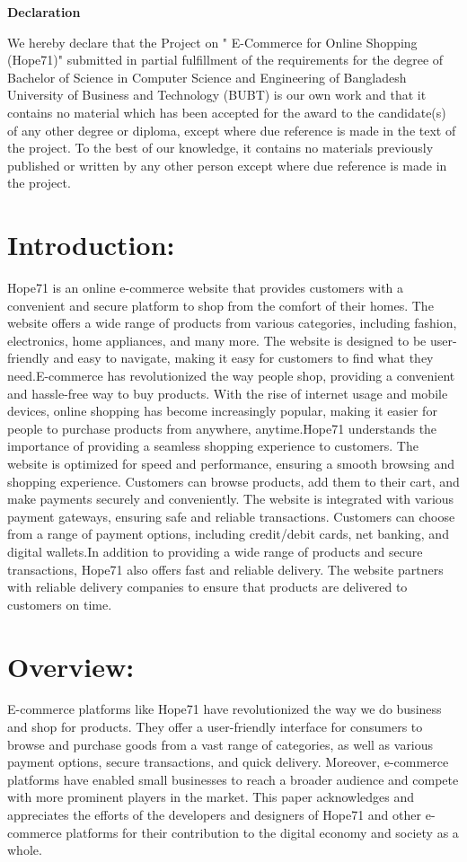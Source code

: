 \documentclass{article}
\begin{document}
\begin{center}
    \huge \textbf{Declaration}
\end{center}
We hereby declare that the Project on " E-Commerce for Online Shopping (Hope71)" submitted in partial fulfillment of the requirements for the degree of Bachelor of Science in Computer Science and Engineering of Bangladesh University of Business and Technology (BUBT) is our own work and that it contains no material which has been accepted for the award to the candidate(s) of any other degree or diploma, except where due reference is made in the text of the project. To the best of our knowledge, it contains no materials previously published or written by any other person except where due reference is made in the project.
\newpage
\tableofcontents
\newpage

\section{Introduction:}
Hope71 is an online e-commerce website that provides customers with a convenient and secure platform to shop from the comfort of their homes. The website offers a wide range of products from various categories, including fashion, electronics, home appliances, and many more. The website is designed to be user-friendly and easy to navigate, making it easy for customers to find what they need.E-commerce has revolutionized the way people shop, providing a convenient and hassle-free way to buy products. With the rise of internet usage and mobile devices, online shopping has become increasingly popular, making it easier for people to purchase products from anywhere, anytime.Hope71 understands the importance of providing a seamless shopping experience to customers. The website is optimized for speed and performance, ensuring a smooth browsing and shopping experience. Customers can browse products, add them to their cart, and make payments securely and conveniently. The website is integrated with various payment gateways, ensuring safe and reliable transactions. Customers can choose from a range of payment options, including credit/debit cards, net banking, and digital wallets.In addition to providing a wide range of products and secure transactions, Hope71 also offers fast and reliable delivery. The website partners with reliable delivery companies to ensure that products are delivered to customers on time.
\section{Overview:}
E-commerce platforms like Hope71 have revolutionized the way we do business and shop for products. They offer a user-friendly interface for consumers to browse and purchase goods from a vast range of categories, as well as various payment options, secure transactions, and quick delivery. Moreover, e-commerce platforms have enabled small businesses to reach a broader audience and compete with more prominent players in the market. This paper acknowledges and appreciates the efforts of the developers and designers of Hope71 and other e-commerce platforms for their contribution to the digital economy and society as a whole.
\newpage
\end{document}
